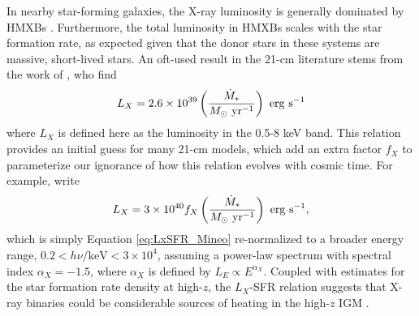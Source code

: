 In nearby star-forming galaxies, the X-ray luminosity is generally dominated by HMXBs \cite{Gilfanov2004,Fabbiano2006,Mineo2012a}. Furthermore, the total luminosity in HMXBs scales with the star formation rate, as expected given that the donor stars in these systems are massive, short-lived stars. An oft-used result in the 21-cm literature stems from the work of \cite{Mineo2012a}, who find
\begin{equation}
	L_X = 2.6 \times 10^{39} \left(\frac{\SFR}{M_{\odot} \ \mathrm{yr}^{-1}} \right) \ \mathrm{erg} \ \mathrm{s}^{-1} \label{eq:LxSFR_Mineo}
\end{equation}
where $L_X$ is defined here as the luminosity in the 0.5-8 keV band. This relation provides an initial guess for many 21-cm models, which add an extra factor $f_X$ to parameterize our ignorance of how this relation evolves with cosmic time. For example, \cite{Furlanetto2006} write
\begin{equation}
	L_X = 3 \times 10^{40} f_X \left(\frac{\SFR}{M_{\odot} \ \mathrm{yr}^{-1}} \right) \ \mathrm{erg} \ \mathrm{s}^{-1} , \label{eq:LxSFR_Furlanetto}
\end{equation}
which is simply Equation \ref{eq:LxSFR_Mineo} re-normalized to a broader energy range, $0.2 < h\nu/\mathrm{keV} < 3\times 10^4$, assuming a power-law spectrum with spectral index $\alpha_X=-1.5$, where $\alpha_X$ is defined by $L_E \propto E^{\alpha_X}$. Coupled with estimates for the star formation rate density at high-$z$, the $L_X$-SFR relation suggests that X-ray binaries could be considerable sources of heating in the high-$z$ IGM \cite{Furlanetto2006,Fragos2013,Mirocha2014,Fialkov2014b,Madau2017}.

